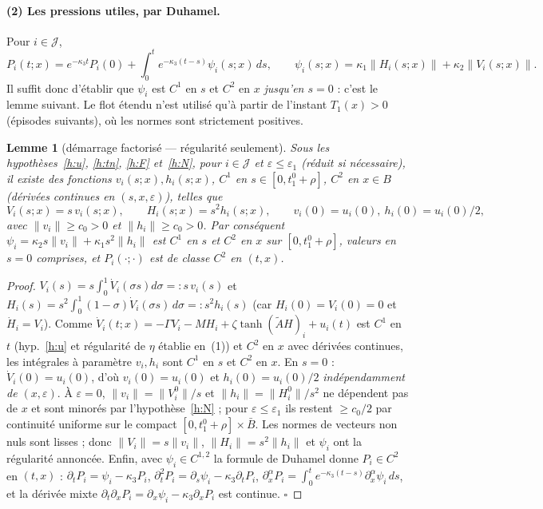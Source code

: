 \documentclass[11pt,a4paper]{article}
\newtheorem{lemme}[theoreme]{Lemme}
\theoremstyle{remark}
\theoremstyle{definition}
\newcommand{\norm}[1]{\lVert #1\rVert}
\newcommand{\eps}{\varepsilon}
\begin{document}
\paragraph{(2) Les pressions utiles, par Duhamel.} Pour $i\in\mathcal J$,
\[
P_i(t;x)=e^{-\kappa_3t}P_i(0)+\int_0^te^{-\kappa_3(t-s)}\psi_i(s;x)\,ds,\qquad \psi_i(s;x)=\kappa_1\norm{H_i(s;x)}+\kappa_2\norm{V_i(s;x)}.
\]
Il suffit donc d'établir que $\psi_i$ est $C^1$ en $s$ et $C^2$ en $x$ \emph{jusqu'en $s=0$} : c'est le lemme suivant. Le flot étendu n'est utilisé qu'à partir de l'instant $T_1(x)>0$ (épisodes suivants), où les normes sont strictement positives.

\begin{lemme}[démarrage factorisé --- régularité seulement]\label{lem:dem}
Sous les hypothèses~\ref{h:u}, \ref{h:tn}, \ref{h:F} et~\ref{h:N}, pour $i\in\mathcal J$ et $\eps\le\eps_1$ (réduit si nécessaire), il existe des fonctions $v_i(s;x),h_i(s;x)$, $C^1$ en $s\in[0,t_1^0+\rho]$, $C^2$ en $x\in B$ (dérivées continues en $(s,x,\eps)$), telles que
\[
V_i(s;x)=s\,v_i(s;x),\qquad H_i(s;x)=s^2h_i(s;x),\qquad v_i(0)=u_i(0),\ h_i(0)=u_i(0)/2,
\]
avec $\norm{v_i}\ge c_0>0$ et $\norm{h_i}\ge c_0>0$. Par conséquent $\psi_i=\kappa_2s\norm{v_i}+\kappa_1s^2\norm{h_i}$ est $C^1$ en $s$ et $C^2$ en $x$ sur $[0,t_1^0+\rho]$, valeurs en $s=0$ comprises, et $P_i(\cdot;\cdot)$ est de classe $C^2$ en $(t,x)$.
\end{lemme}
\begin{proof}
$V_i(s)=s\int_0^1\dot V_i(\sigma s)d\sigma=:s\,v_i(s)$ et $H_i(s)=s^2\int_0^1(1-\sigma)\dot V_i(\sigma s)\,d\sigma=:s^2h_i(s)$ (car $H_i(0)=V_i(0)=0$ et $\dot H_i=V_i$). Comme $\dot V_i(t;x)=-\Gamma V_i-MH_i+\zeta\tanh(\tilde AH)_i+u_i(t)$ est $C^1$ en $t$ (hyp.~\ref{h:u} et régularité de $\eta$ établie en~(1)) et $C^2$ en $x$ avec dérivées continues, les intégrales à paramètre $v_i,h_i$ sont $C^1$ en $s$ et $C^2$ en $x$. En $s=0$ : $\dot V_i(0)=u_i(0)$, d'où $v_i(0)=u_i(0)$ et $h_i(0)=u_i(0)/2$ \emph{indépendamment de $(x,\eps)$}. À $\eps=0$, $\norm{v_i}=\norm{V^0_i}/s$ et $\norm{h_i}=\norm{H^0_i}/s^2$ ne dépendent pas de $x$ et sont minorés par l'hypothèse~\ref{h:N} ; pour $\eps\le\eps_1$ ils restent $\ge c_0/2$ par continuité uniforme sur le compact $[0,t_1^0+\rho]\times\bar B$. Les normes de vecteurs non nuls sont lisses ; donc $\norm{V_i}=s\norm{v_i}$, $\norm{H_i}=s^2\norm{h_i}$ et $\psi_i$ ont la régularité annoncée. Enfin, avec $\psi_i\in C^{1,2}$ la formule de Duhamel donne $P_i\in C^2$ en $(t,x)$ : $\partial_tP_i=\psi_i-\kappa_3P_i$, $\partial_t^2P_i=\partial_s\psi_i-\kappa_3\partial_tP_i$, $\partial_x^\alpha P_i=\int_0^te^{-\kappa_3(t-s)}\partial_x^\alpha\psi_i\,ds$, et la dérivée mixte $\partial_t\partial_xP_i=\partial_x\psi_i-\kappa_3\partial_xP_i$ est continue. $\square$
\end{proof}
\end{document}
